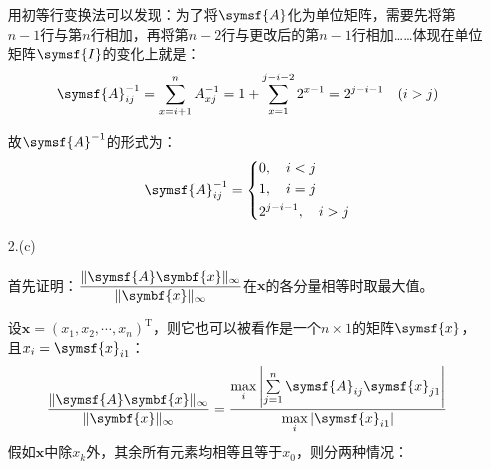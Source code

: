 \documentclass[a4paper]{article}
\renewcommand\mathsf{\symsf}
\renewcommand{\bm}{\symbf}
\begin{document}
\begin{enumerate}
用初等行变换法可以发现：为了将$\mathsf{A}$化为单位矩阵，需要先将第$n-1$行与第$n$行相加，再将第$n-2$行与更改后的第$n-1$行相加……体现在单位矩阵$\mathsf{I}$的变化上就是：
\[
    \mathsf{A}^{-1}_{ij} = \sum_{x=i+1}^n A^{-1}_{xj} = 1 + \sum_{x=1}^{j-i-2} 2^{x-1} = 2^{j-i-1} \quad (i>j)
\]

故$\mathsf{A}^{-1}$的形式为：
\[
    \mathsf{A}^{-1}_{ij} = \left\{
        \begin{aligned}
            &0,\quad i<j \\
            &1,\quad i=j \\
            &2^{j-i-1},\quad i>j \\
        \end{aligned}
    \right.
\]

\item[2.(c)]

首先证明：$\dfrac{\|\mathsf{A}\bm{x}\|_\infty}{\|\bm{x}\|_\infty}$在$\bm{x}$的各分量相等时取最大值。

设$\bm{x}=(x_1,x_2,\cdots,x_n)^\mathrm{T}$，则它也可以被看作是一个$n\times1$的矩阵$\mathsf{x}$，且$x_i=\mathsf{x}_{i1}$：
\[
    \frac{\|\mathsf{A}\bm{x}\|_\infty}{\|\bm{x}\|_\infty} = \frac{\max\limits_i\left|\sum\limits_{j=1}^n \mathsf{A}_{ij}\mathsf{x}_{j1}\right|}{\max\limits_i|\mathsf{x}_{i1}|}
\]
假如$\bm{x}$中除$x_k$外，其余所有元素均相等且等于$x_0$，则分两种情况：


\end{enumerate}
\end{document}
